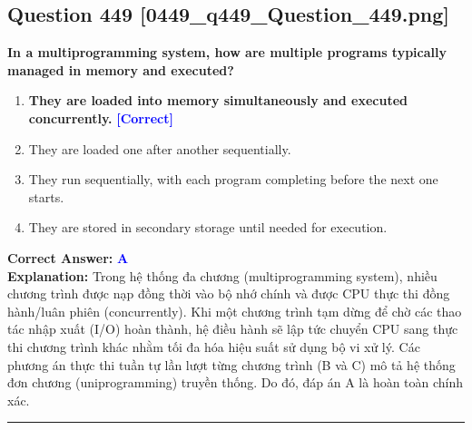 \documentclass[11pt,a4paper]{article}
\begin{document}
\begin{minipage}{\textwidth}
\subsection*{Question 449 \quad \footnotesize{[0449\_q449\_Question\_449.png]}}
\noindent \textbf{In a multiprogramming system, how are multiple programs typically managed in memory and executed?}

\begin{enumerate}[label=\Alph*.]
    \item \textbf{They are loaded into memory simultaneously and executed concurrently.} \hfill \textcolor{blue}{\textbf{[Correct]}}
    \item They are loaded one after another sequentially.
    \item They run sequentially, with each program completing before the next one starts.
    \item They are stored in secondary storage until needed for execution.
\end{enumerate}

\noindent \textbf{Correct Answer:} \textcolor{blue}{\textbf{A}} \\[2pt]
\noindent \textbf{Explanation:} Trong hệ thống đa chương (multiprogramming system), nhiều chương trình được nạp đồng thời vào bộ nhớ chính và được CPU thực thi đồng hành/luân phiên (concurrently). Khi một chương trình tạm dừng để chờ các thao tác nhập xuất (I/O) hoàn thành, hệ điều hành sẽ lập tức chuyển CPU sang thực thi chương trình khác nhằm tối đa hóa hiệu suất sử dụng bộ vi xử lý. Các phương án thực thi tuần tự lần lượt từng chương trình (B và C) mô tả hệ thống đơn chương (uniprogramming) truyền thống. Do đó, đáp án A là hoàn toàn chính xác.

\par\vspace{0.3cm}
\hrule
\vspace{0.3cm}
\end{minipage}
\end{document}
